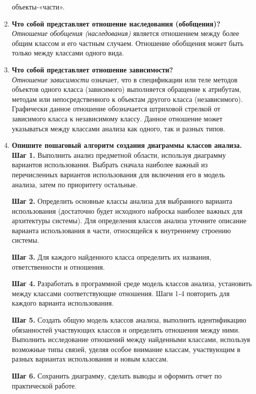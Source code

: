 \begin{enumerate}
	объекты-«части».
	\item \textbf{Что собой представляет отношение наследования (обобщения)?}\\
	\textit{Отношение обобщения (наследования)} является отношением между
	более общим классом и его частным случаем. Отношение обобщения
	может быть только между классами одного вида.
	\item \textbf{Что собой представляет отношение зависимости?}\\
	\textit{Отношение зависимости} означает, что в спецификации
	или теле методов объектов одного класса (зависимого) выполняется
	обращение к атрибутам, методам или непосредственного к объектам
	другого класса (независимого). Графически данное отношение
	обозначается штриховой стрелкой от зависимого класса к независимому
	классу. Данное отношение может указываться между классами анализа
	как одного, так и разных типов.
	\item \textbf{Опишите пошаговый алгоритм создания диаграммы
	классов анализа.}\\
	\textbf{Шаг 1.} Выполнить анализ предметной области,
	используя диаграмму вариантов использования. Выбрать сначала
	наиболее важный из перечисленных вариантов использования для включения
	его в модель анализа, затем по приоритету остальные.\par
	\textbf{Шаг 2.} Определить основные классы анализа для выбранного
	варианта использования (достаточно будет исходного наброска наиболее
	важных для архитектуры системы). Для определения классов анализа
	уточните описание варианта использования в части, относящейся
	к внутреннему строению системы.\par
	\textbf{Шаг 3.} Для каждого найденного класса определить их названия,
	ответственности и отношения.\par
	\textbf{Шаг 4.} Разработать в программной среде модель классов
	анализа, установить между классами соответствующие отношения.
	Шаги 1-4 повторить для каждого варианта использования.\par
	\textbf{Шаг 5.} Создать общую модель классов анализа,
	выполнить идентификацию обязанностей участвующих классов и определить
	отношения между ними. Выполнить исследование отношений между
	найденными классами, используя возможные типы связей, уделяя особое
	внимание классам, участвующим в разных вариантах использования
	и новым классам.\par
	\textbf{Шаг 6.} Сохранить диаграмму, сделать выводы и оформить
	отчет по практической работе.\par
\end{enumerate}

